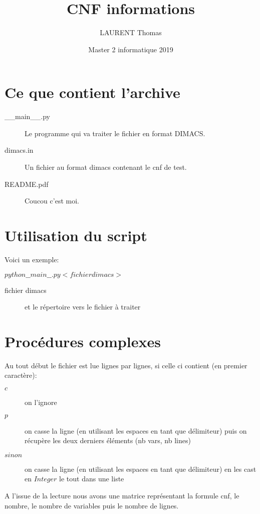 \documentclass[french, 12pt]{report}
\title{CNF informations}
\author{LAURENT Thomas}
\date{Master 2 informatique 2019}
\newcommand{\formula}[1]{
\begin{center}
{#1}
\end{center}
}
\begin{document}
\maketitle
\pagebreak

\section{Ce que contient l'archive}

\begin{description}
\item[\_\_main\_\_.py] Le programme qui va traiter le fichier en format DIMACS.
\item[dimacs.in] Un fichier au format dimacs contenant le cnf de test.
\item[README.pdf] Coucou c'est moi.
\end{description}

\section{Utilisation du script}
Voici un exemple:
\formula{$python \_\_main\_\_.py <fichier dimacs>$}

\begin{description}
\item[fichier dimacs] et le répertoire vers le fichier à traiter
\end{description}

\pagebreak

\section{Procédures complexes}

Au tout début le fichier est lue lignes par lignes, si celle ci contient (en premier caractère):
\begin{description}
\item[$c$] on l'ignore
\item[$p$] on casse la ligne (en utilisant les espaces en tant que délimiteur) puis on récupère les deux derniers éléments (nb vars, nb lines)
\item[$sinon$] on casse la ligne (en utilisant les espaces en tant que délimiteur) en les cast en $Integer$ le tout dans une liste
\end{description}

A l'issue de la lecture nous avons une matrice représentant la formule cnf, le nombre, le nombre de variables puis le nombre de lignes.
\end{document}
